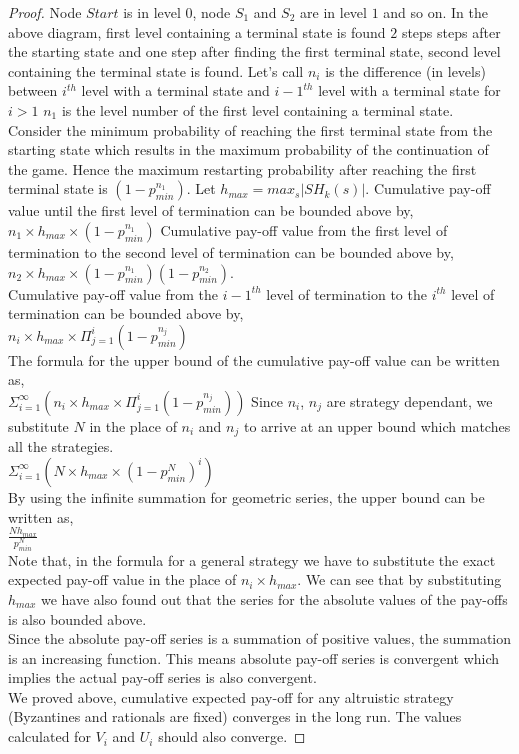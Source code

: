 \begin{proof}
	Node $Start$ is in level $0$, node $S_1$ and $S_2$ are in level $1$ and so on.
	In the above diagram, first level containing a terminal state is found $2$ steps steps after the starting state and one step after finding the first terminal state, second level containing the terminal state is found. Let's call $n_i$ is the difference (in levels) between $i^{th}$ level with a terminal state and $i-1^{th}$ level with a terminal state for $i>1$ $n_1$ is the level number of the first level containing a terminal state.\\
	Consider the minimum probability of reaching the first terminal state from the starting state which results in the maximum probability of the continuation of the game. Hence the maximum restarting probability after reaching the first terminal state is $(1-p_{min}^{n_1})$. Let $h_{max}= max_s |SH_k(s)|$. Cumulative pay-off value until the first level of termination can be bounded above by,\\
	$n_1 \times h_{max} \times (1-p_{min}^{n_1}) $ Cumulative pay-off value from the first level of termination to the second level of termination can be bounded above by,\\
	$n_2 \times h_{max} \times (1-p_{min}^{n_1})(1-p_{min}^{n_2}) $.\\
	Cumulative pay-off value from the $i-1 ^{th}$ level of termination to the $i^{th}$ level of termination can be bounded above by,\\
	$n_i \times h_{max} \times \Pi_{j=1}^{i} (1-p_{min}^{n_j}) $\\
	The formula for the upper bound of the cumulative pay-off value can be written as,\\
	$\Sigma_{i=1}^{\infty}(n_i \times h_{max} \times \Pi_{j=1}^{i} (1-p_{min}^{n_j})) $
	Since $n_i$, $n_j$ are strategy dependant, we substitute $N$ in the place of $n_i$ and $n_j$ to arrive at an upper bound which matches all the strategies.\\
	$\Sigma_{i=1}^{\infty}(N \times h_{max} \times (1-p_{min}^{N})^i) $\\
	By using the infinite summation for geometric series, the upper bound can be written as,\\
	$\frac{Nh_{max}}{p_{min}^{N}}$\\
	Note that, in the formula for a general strategy we have to substitute the exact expected pay-off value in the place of $n_i \times h_{max}$. We can see that by substituting $h_{max}$ we have also found out that the series for the absolute values of the pay-offs is also bounded above. \\
	Since the absolute pay-off series is a summation of positive values, the summation is an increasing function. This means absolute pay-off series is convergent which implies the actual pay-off series is also convergent.\\
	We proved above, cumulative expected pay-off for any altruistic strategy (Byzantines and rationals are fixed) converges in the long run. The values calculated for $V_i$ and $U_i$ should also converge.
\end{proof}

  